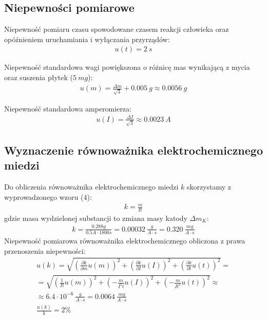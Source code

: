 \documentclass{fizykalab}
\begin{document}
{\subsection*{Niepewności pomiarowe}
\par
Niepewność pomiaru czasu spowodowane czasem reakcji człowieka oraz opóźnieniem uruchamiania i wyłączania przyrządów:
\begin{gather*}
	u(t) = 2 \ s 
\end{gather*}

Niepewność standardowa wagi powiększona o różnicę mas wynikającą z mycia oraz suszenia płytek ($5 \ mg$):
\begin{gather*}
	u(m) = \frac{\Delta m}{\sqrt{3}} + 0.005 \ g \approx 0.0056 \ g
\end{gather*}

Niepewność standardowa amperomierza:
\begin{gather*}
	u(I) = \frac{\Delta I}{\sqrt{3}} \approx 0.0023 \ A
\end{gather*}


\newpage

\subsection*{Wyznaczenie równoważnika elektrochemicznego miedzi}
\par
Do obliczenia równoważnika elektrochemicznego miedzi $k$ skorzystamy z wyprowadzonego wzoru (4):
\begin{gather*}
	k = \frac{m}{It}
\end{gather*}
gdzie masa wydzielonej substancji to zmiana masy katody $\Delta m_K$:
\begin{gather*}
	k = \frac{0.288g}{0.5A \cdot 1800s} = 0.00032 \ \frac{g}{A \cdot s} = 0.320 \ \frac{mg}{A \cdot s}
\end{gather*}
Niepewność pomiarowa równoważnika elektrochemicznego obliczona z prawa przenoszenia niepewności:
\begin{gather*}
	u(k) = \sqrt{\left(\frac{\partial k}{\partial m}u(m)\right)^2 + \left(\frac{\partial k}{\partial I}u(I)\right)^2 + \left(\frac{\partial k}{\partial t}u(t)\right)^2} = \\
	= \sqrt{\left(\frac{1}{It}u(m)\right)^2 + \left(-\frac{m}{I^2t}u(I)\right)^2 + \left(-\frac{m}{It^2}u(t)\right)^2} \approx \\
	\approx 6.4 \cdot 10^{-6} \ \frac{g}{A \cdot s} = 0.0064 \ \frac{mg}{A \cdot s} \\
	\frac{u(k)}{k} = 2 \%
\end{gather*}

}
\end{document}
